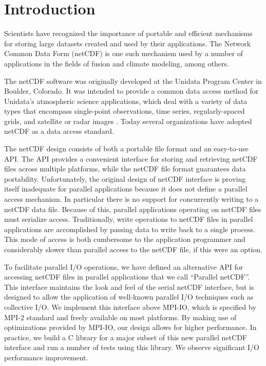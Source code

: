 \documentclass[10pt,twocolumn]{article}          %
\begin{document}
\section{Introduction}

Scientists have recognized the importance of portable and
efficient mechanisms for storing large datasets created and used
by their applications. The Network Common Data Form (netCDF)
\cite{ReDa90, RDED97} is one such mechanism used by a number of
applications in the fields of fusion and climate modeling, among
others.

The netCDF software was originally developed at the Unidata Program Center in Boulder, Colorado. It
was intended to provide a common data access method for Unidata's atmospheric science applications,
which deal with a variety of data types that encompass single-point observations, time series,
regularly-spaced grids, and satellite or radar images \cite{RDED97}. Today several organizations
have adopted netCDF as a data access standard.

The netCDF design consists of both a portable file format and an
easy-to-use API. The API provides a convenient interface for
storing and retrieving netCDF files across multiple platforms,
while the netCDF file format guarantees data portability.
Unfortunately, the original design of netCDF interface is proving
itself inadequate for parallel applications because it does not
define a parallel access mechanism. In particular there is no
support for concurrently writing to a netCDF data file. Because of
this, parallel applications operating on netCDF files must
serialize access. Traditionally, write operations to netCDF files
in parallel applications are accomplished by passing data to write
back to a single process. This mode of access is both cumbersome
to the application programmer and considerably slower than
parallel access to the netCDF file, if this were an option.

To facilitate parallel I/O operations, we have defined an alternative API for accessing netCDF
files in parallel applications that we call ``Parallel netCDF''. This interface maintains the look
and feel of the serial netCDF interface, but is designed to allow the application of well-known
parallel I/O techniques such as collective I/O. We implement this interface above MPI-IO, which is
specified by MPI-2 standard \cite{GrLT99, Mess97, GLDS96} and freely available on most platforms.
By making use of optimizations provided by MPI-IO, our design allows for higher performance. In
practice, we build a C library for a major subset of this new parallel netCDF interface and run a
number of tests using this library. We observe significant I/O performance improvement.
\end{document}

